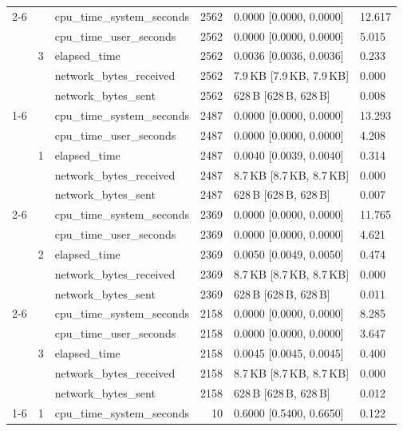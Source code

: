 \begin{tabular}{lllrll}
\cline{2-6}
 & \multirow[t]{5}{*}{3} & cpu_time_system_seconds & 2562 & 0.0000 [0.0000, 0.0000] & 12.617 \\
 &  & cpu_time_user_seconds & 2562 & 0.0000 [0.0000, 0.0000] & 5.015 \\
 &  & elapsed_time & 2562 & 0.0036 [0.0036, 0.0036] & 0.233 \\
 &  & network_bytes_received & 2562 & 7.9\,KB [7.9\,KB, 7.9\,KB] & 0.000 \\
 &  & network_bytes_sent & 2562 & 628\,B [628\,B, 628\,B] & 0.008 \\
\cline{1-6} \cline{2-6}
\multirow[t]{15}{*}{knn-search-postgis-small} & \multirow[t]{5}{*}{1} & cpu_time_system_seconds & 2487 & 0.0000 [0.0000, 0.0000] & 13.293 \\
 &  & cpu_time_user_seconds & 2487 & 0.0000 [0.0000, 0.0000] & 4.208 \\
 &  & elapsed_time & 2487 & 0.0040 [0.0039, 0.0040] & 0.314 \\
 &  & network_bytes_received & 2487 & 8.7\,KB [8.7\,KB, 8.7\,KB] & 0.000 \\
 &  & network_bytes_sent & 2487 & 628\,B [628\,B, 628\,B] & 0.007 \\
\cline{2-6}
 & \multirow[t]{5}{*}{2} & cpu_time_system_seconds & 2369 & 0.0000 [0.0000, 0.0000] & 11.765 \\
 &  & cpu_time_user_seconds & 2369 & 0.0000 [0.0000, 0.0000] & 4.621 \\
 &  & elapsed_time & 2369 & 0.0050 [0.0049, 0.0050] & 0.474 \\
 &  & network_bytes_received & 2369 & 8.7\,KB [8.7\,KB, 8.7\,KB] & 0.000 \\
 &  & network_bytes_sent & 2369 & 628\,B [628\,B, 628\,B] & 0.011 \\
\cline{2-6}
 & \multirow[t]{5}{*}{3} & cpu_time_system_seconds & 2158 & 0.0000 [0.0000, 0.0000] & 8.285 \\
 &  & cpu_time_user_seconds & 2158 & 0.0000 [0.0000, 0.0000] & 3.647 \\
 &  & elapsed_time & 2158 & 0.0045 [0.0045, 0.0045] & 0.400 \\
 &  & network_bytes_received & 2158 & 8.7\,KB [8.7\,KB, 8.7\,KB] & 0.000 \\
 &  & network_bytes_sent & 2158 & 628\,B [628\,B, 628\,B] & 0.012 \\
\cline{1-6} \cline{2-6}
\multirow[t]{15}{*}{point-in-polygon-lookup-duckdb-large} & \multirow[t]{5}{*}{1} & cpu_time_system_seconds & 10 & 0.6000 [0.5400, 0.6650] & 0.122 \\

\end{tabular}
